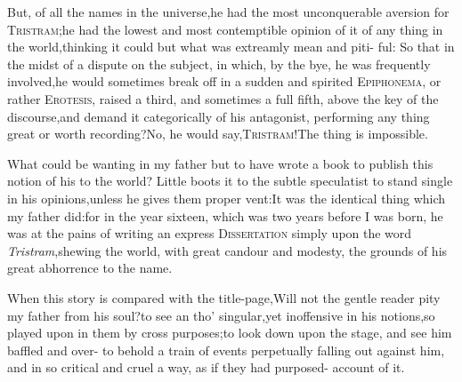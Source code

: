 \documentclass{article}
\begin{document}
But, of all the names in the universe,\break he had the most unconquerable aversion for
\textsc{Tristram};\tsk  he had the lowest and most contemptible opinion
of it of any thing in the world,\tsk  thinking it
could  but what was extreamly mean and piti-
ful: So
that in the midst of a dispute on the subject, in which, by the bye, he was
frequently involved,\tsh  he would sometimes break off in a sudden and
spirited \textsc{Epiphonema}, or rather \textsc{Erotesis}, raised a
third, and sometimes a full fifth, above the key of the
discourse,\tsh  and demand it categorically of his antagonist,
performing any thing great or worth
re\-cording?\tsk  No\tsk, he would
say,\tsk  \textsc{Tri\-stram}!\tsk  The thing is impossible.

What could be wanting in my father but to have wrote a book to
publish this notion of his to the world? Little boots it to the
subtle speculatist to stand single in his opinions,\tsk  unless he
gives them proper vent:\tsk  It was the identical thing which my
father did:\tsk  for in the year sixteen, which was two years
before I was born, he was at the pains of writing an express
\textsc{Dissertation} simply upon the word
\textit{Tristram},\tsk  shewing the world, with great candour and
modesty, the grounds of his great abhorrence to the name.

When this story is compared with the title-page,\tsk  Will not
the gentle reader pity my father from his soul?\tsk  to see an\break
{}\break
tho’ singular,\tsk  yet inoffensive in his no\-tions,\tsk  so played
upon in them by cross purposes;\tsh  to look down upon
the stage, and see him baffled and over-\break
{}
to behold a train of events perpetually
falling out against him, and in so critical and cruel a way, as if
they had purposed- 
account of it.
\end{document}
